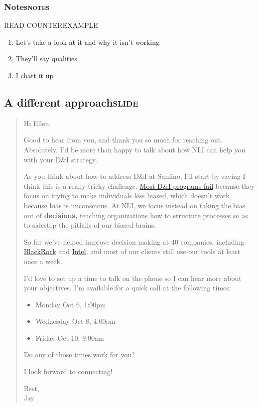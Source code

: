 \documentclass[11pt]{article}
\begin{document}
\subsubsection{Notes\hfill{}\textsc{notes}}
\label{sec:orgf150622}
READ COUNTEREXAMPLE

\begin{enumerate}
\item Let's take a look at it and why it isn't working
\item They'll say qualities
\item I chart it up
\end{enumerate}

\subsection{A different approach\hfill{}\textsc{slide}}
\label{sec:orga50b8bc}
\begin{quote}
Hi Ellen,

Good to hear from you, and thank you so much for reaching out. Absolutely, I'd be more than happy to talk about how NLI can help you with your D\&I strategy.

As you think about how to address D\&I at Sanfino, I'll start by saying I think this is a really tricky challenge. \href{//hbr.org/2016/07/why-diversity-programs-fail}{Most D\&I programs fail} because they focus on trying to make individuals less biased, which doesn't work because bias is unconscious. At NLI, we focus instead on taking the bias out of \textbf{decisions,} teaching organizations how to structure processes so as to sidestep the pitfalls of our biased brains.

So far we've helped improve decision making at 40 companies, including \href{https://neuroleadership.com/portfolio-items/case-study-blackrock-breaking-bias/}{BlackRock} and \href{https://neuroleadership.com/portfolio-items/nli-transforms-intel-culture/}{Intel}, and most of our clients still use our tools at least once a week.

I'd love to set up a time to talk on the phone so I can hear more about your objectives. I'm available for a quick call at the following times:

\begin{itemize}
\item Monday Oct 6, 1:00pm
\item Wednesday Oct 8, 4:00pm
\item Friday Oct 10, 9:00am
\end{itemize}

Do any of those times work for you?

I look forward to connecting!

Best, \\
Jay
\end{quote}
\end{document}

